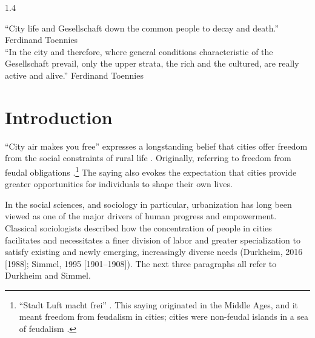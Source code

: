 \documentclass[10pt, letterpaper]{article}
\begin{document}
\begin{spacing}{1.4} 


\noindent ``City life and Gesellschaft down the common people to decay and death.'' Ferdinand Toennies\\

\noindent ``In the city and therefore, where general conditions characteristic of the Gesellschaft prevail, only the upper strata, the rich and the cultured, are really active and alive.'' Ferdinand Toennies\\ %


\section{Introduction}
``City air makes you free'' expresses a longstanding belief that cities offer freedom from the social constraints of rural life \citep{yamagishi12}. 
Originally, referring to freedom from feudal obligations \citep{harvey12,park84,yamagishi12}.\footnote{``Stadt Luft macht frei'' \citep[p. 12]{park84}. This saying originated in the Middle Ages, and it meant freedom from feudalism in cities; cities were non-feudal islands in a sea of feudalism \citep{harvey12}.}%
 The saying also evokes the expectation that cities provide greater opportunities for individuals to shape their own lives. %

In the social sciences, and sociology in particular, urbanization has long been viewed as one of the major drivers of human progress and empowerment. Classical sociologists described how the concentration of people in cities facilitates and necessitates a finer division of labor and greater specialization to satisfy existing and newly emerging, increasingly diverse needs (Durkheim, 2016 [1988]; Simmel, 1995 [1901--1908]). The next three paragraphs all refer to Durkheim and Simmel.


\end{spacing}
\end{document}
